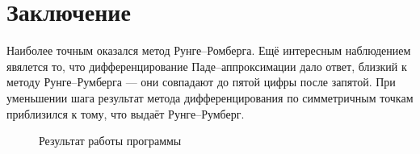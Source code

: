 \documentclass[a4paper,10pt]{article}
\begin{document}
\section{Заключение}
    Наиболее точным оказался метод Рунге--Ромберга. Ещё интересным наблюдением явялется то, что дифференцирование Паде--аппроксимации дало ответ, близкий к методу Рунге--Румберга --- они совпадают до пятой цифры после запятой. При уменьшении шага результат метода дифференцирования по симметричным точкам приблизился к тому, что выдаёт Рунге--Румберг.
\begin{figure}[h]
\begin{minipage}[h]{0.6\linewidth}
\end{minipage}
\hfill
\begin{minipage}[h]{0.6\linewidth}
\end{minipage}
\caption{Результат работы программы}
\label{ris:image1}
\end{figure}
    
\end{document}
